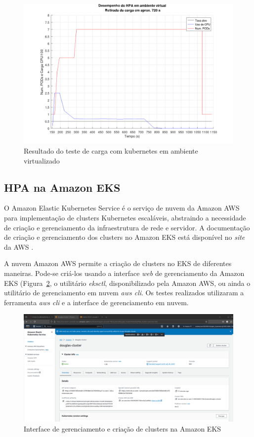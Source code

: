 \documentclass[12pt]{article}
\begin{document}
\begin{figure}[htbp]
\centering
\includegraphics[width=.9\textwidth]{ambiente_virtual.png}
\caption{Resultado do teste de carga com kubernetes em ambiente virtualizado}
\label{fig:resultado-vm}
\end{figure}

\subsection{HPA na Amazon EKS}

O Amazon Elastic Kubernetes Service é o serviço de nuvem da Amazon AWS para implementação de clusters Kubernetes escaláveis, abstraindo a necessidade de criação e gerenciamento da infraestrutura de rede e servidor. A documentação de criação e gerenciamento dos clusters no Amazon EKS está disponível no \textit{site} da AWS \cite{amazon_getting_nodate}.

A nuvem Amazon AWS permite a criação de clusters no EKS de diferentes maneiras. Pode-se criá-los usando a interface \textit{web} de gerenciamento da Amazon EKS (Figura~\ref{fig:interface-amazon-eks}, o utilitário \textit{eksctl}, disponibilizado pela Amazon AWS, ou ainda o utilitário de gerenciamento em nuvem \textit{aws cli}. Os testes realizados utilizaram a ferramenta \textit{aws cli} e a interface de gerenciamento em nuvem.

\begin{figure}[htbp]
\centering
\includegraphics[width=.9\textwidth]{douglas-cluster.png}
\caption{Interface de gerenciamento e criação de clusters na Amazon EKS}
\label{fig:interface-amazon-eks}
\end{figure}
\end{document}
